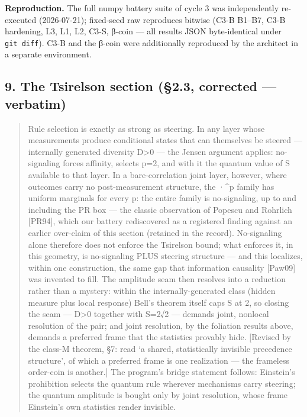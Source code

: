 \documentclass[
  11pt]{article}
\begin{document}
\textbf{Reproduction.} The full numpy battery suite of cycle 3 was
independently re-executed (2026-07-21); fixed-seed raw reproduces
bitwise (C3-B B1--B7, C3-B hardening, L3, L1, L2, C3-S, β-coin --- all
results JSON byte-identical under \texttt{git\ diff}). C3-B and the
β-coin were additionally reproduced by the architect in a separate
environment.

\subsection{9. The Tsirelson section (§2.3, corrected ---
verbatim)}\label{the-tsirelson-section-2.3-corrected-verbatim}

\begin{quote}
Rule selection is exactly as strong as steering. In any layer whose
measurements produce conditional states that can themselves be steered
--- internally generated diversity D\textgreater0 --- the Jensen
argument applies: no-signaling forces affinity, selects p=2, and with it
the quantum value of S available to that layer. In a bare-correlation
joint layer, however, where outcomes carry no post-measurement
structure, the \textbar·\textbar\^{}p family has uniform marginals for
every p: the entire family is no-signaling, up to and including the PR
box --- the classic observation of Popescu and Rohrlich {[}PR94{]},
which our battery rediscovered as a registered finding against an
earlier over-claim of this section (retained in the record).
No-signaling alone therefore does not enforce the Tsirelson bound; what
enforces it, in this geometry, is no-signaling PLUS steering structure
--- and this localizes, within one construction, the same gap that
information causality {[}Paw09{]} was invented to fill. The amplitude
seam then resolves into a reduction rather than a mystery: within the
internally-generated class (hidden measure plus local response) Bell's
theorem itself caps S at 2, so closing the seam --- D\textgreater0
together with S=2√2 --- demands joint, nonlocal resolution of the pair;
and joint resolution, by the foliation results above, demands a
preferred frame that the statistics provably hide. {[}Revised by the
class-M theorem, §7: read `a shared, statistically invisible precedence
structure', of which a preferred frame is one realization --- the
frameless order-coin is another.{]} The program's bridge statement
follows: Einstein's prohibition selects the quantum rule wherever
mechanisms carry steering; the quantum amplitude is bought only by joint
resolution, whose frame Einstein's own statistics render invisible.
\end{quote}
\end{document}
